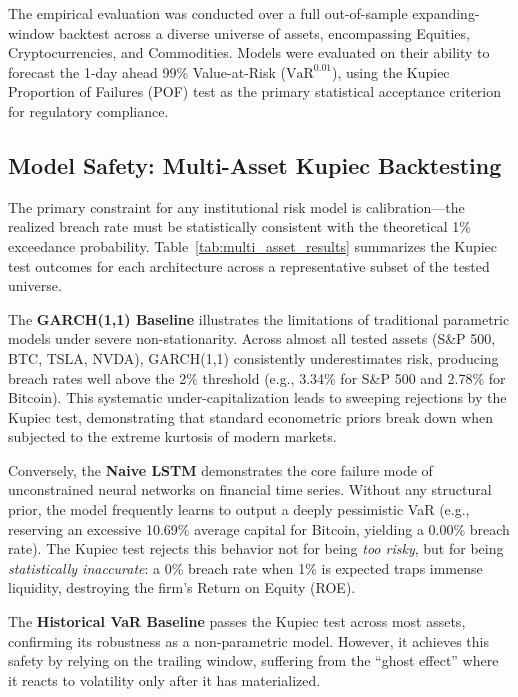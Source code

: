 
The empirical evaluation was conducted over a full out-of-sample expanding-window backtest across a diverse universe of assets, encompassing Equities, Cryptocurrencies, and Commodities. Models were evaluated on their ability to forecast the 1-day ahead 99\% Value-at-Risk ($\text{VaR}^{0.01}$), using the Kupiec Proportion of Failures (POF) test \cite{kupiec1995techniques} as the primary statistical acceptance criterion for regulatory compliance.

\subsection{Model Safety: Multi-Asset Kupiec Backtesting}

The primary constraint for any institutional risk model is calibration---the realized breach rate must be statistically consistent with the theoretical 1\% exceedance probability. Table~\ref{tab:multi_asset_results} summarizes the Kupiec test outcomes for each architecture across a representative subset of the tested universe.

The \textbf{GARCH(1,1) Baseline} illustrates the limitations of traditional parametric models under severe non-stationarity. Across almost all tested assets (S\&P 500, BTC, TSLA, NVDA), GARCH(1,1) consistently underestimates risk, producing breach rates well above the 2\% threshold (e.g., 3.34\% for S\&P 500 and 2.78\% for Bitcoin). This systematic under-capitalization leads to sweeping rejections by the Kupiec test, demonstrating that standard econometric priors break down when subjected to the extreme kurtosis of modern markets.

Conversely, the \textbf{Naive LSTM} demonstrates the core failure mode of unconstrained neural networks on financial time series. Without any structural prior, the model frequently learns to output a deeply pessimistic VaR (e.g., reserving an excessive 10.69\% average capital for Bitcoin, yielding a 0.00\% breach rate). The Kupiec test rejects this behavior not for being \emph{too risky}, but for being \emph{statistically inaccurate}: a 0\% breach rate when 1\% is expected traps immense liquidity, destroying the firm's Return on Equity (ROE).

The \textbf{Historical VaR Baseline} passes the Kupiec test across most assets, confirming its robustness as a non-parametric model. However, it achieves this safety by relying on the trailing window, suffering from the ``ghost effect'' where it reacts to volatility only after it has materialized.

